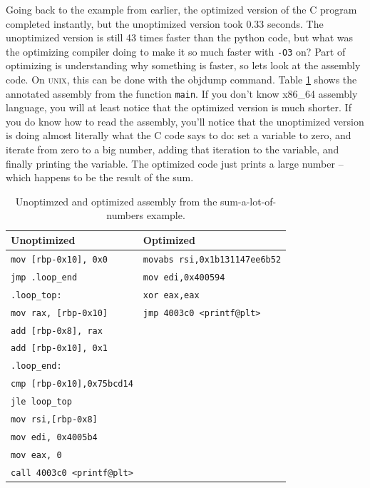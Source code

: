 \documentclass[12pt]{article}
\begin{document}
Going back to the example from earlier, the optimized version of the C program completed instantly, but
the unoptimized version took 0.33 seconds. The unoptimized version is still 43 times faster than the
python code, but what was the optimizing compiler doing to make it so much faster with \texttt{-O3} on?
Part of optimizing is understanding why something is faster, so lets look at the assembly code. On \textsc{unix},
this can be done with the objdump command. Table \ref{table:assem-1} shows the annotated assembly from
the function \texttt{main}. If you don't know x86\_64 assembly language, you will at least notice that the
optimized version is much shorter. If you do know how to read the assembly, you'll notice that the unoptimized
version is doing almost literally what the C code says to do: set a variable to zero, and iterate from zero to
a big number, adding that iteration to the variable, and finally printing the variable. The optimized code just prints a large number -- which happens to be the result of the sum.

\begin{table}[h]
	\centering
\begin{tabular}{l | l}
	\hline
	\textbf{Unoptimized} & \textbf{Optimized}\\
	\hline
	\texttt{mov [rbp-0x10], 0x0}	&\texttt{movabs rsi,0x1b131147ee6b52} \\
	\texttt{jmp .loop\_end			}	&\texttt{mov edi,0x400594} \\
	\texttt{.loop\_top:                } &\texttt{xor eax,eax   } \\
	\texttt{mov rax, [rbp-0x10]				}	&\texttt{jmp 4003c0 <printf@plt>}\\
	\texttt{add [rbp-0x8], rax				}	&\texttt{	} \\
	\texttt{add [rbp-0x10], 0x1				}	&\texttt{ }\\	
	\texttt{.loop\_end:                       } &\texttt{} \\
	\texttt{cmp [rbp-0x10],0x75bcd14} &\texttt{} \\
	\texttt{jle loop\_top} &\texttt{} \\
	\texttt{mov rsi,[rbp-0x8]} &\texttt{} \\
	\texttt{mov edi, 0x4005b4} &\texttt{} \\
	\texttt{mov eax, 0} &\texttt{} \\
	\texttt{call 4003c0 <printf@plt>} &\texttt{} \\
\end{tabular}
	\caption{Unoptimzed and optimized assembly from the sum-a-lot-of-numbers example.}
	\label{table:assem-1}
\end{table}
\end{document}
